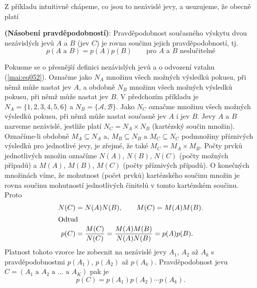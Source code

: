       
      
      Z příkladu intuitivně chápeme, co jsou to nezávislé jevy, a usuzujeme, že obecně platí
      \begin{lemma}\label{mai:lemma003}
        \textbf{(Násobení pravděpodobností)}: Pravděpodobnost současného výskytu dvou nezávislých 
        jevů \(A\) a \(B\) (jev \(C\)) je rovna součinu jejich pravděpodobností, tj.
        \begin{equation}\label{mai:eq052}
           p(A \text{ a } B)= p(A)p(B)\qquad \text{pro } A \text{ a } B \text{ neslučitelné}
        \end{equation}
      \end{lemma}
      
      Pokusme se o přesnější definici nezávislých jevů a o odvození vztahu (\ref{mai:eq052}). 
      Označme jako \(N_A\) množinu všech možných výsledků pokusu, při němž může nastat jev \(A\), a 
      obdobně \(N_B\) množinu všech možných výsledků pokusu, při němž může nastat jev \(B\). V 
      předchozím příkladu je \(N_A = \{1, 2, 3, 4, 5, 6\}\) a \(N_B = \{\mathcal{A}, 
      \mathcal{B}\}\). Jako \(N_C\) označme množinu všech možných výsledků pokusu, při němž může 
      nastat současně jev \(A\) i jev \(B\). Jevy \(A\) a \(B\) nazveme nezávislé, jestliže
      platí \(N_C = N_A \times N_B\) (kartézský součin množin). Označíme-li obdobně \(M_A \subseteq 
      N_A\) a, \(M_B \subseteq N_B\) a \(M_C \subseteq N_C\) podmnožiny příznivých výsledků pro 
      jednotlivé jevy, je zřejmé, že také \(M_C = M_A \times M_B\). Počty prvků jednotlivých množin 
      označíme \(N(A)\), \(N(B)\), \(N(C)\) (počty možných případů) a \(M(A)\), \(M(B)\), \(M(C)\) 
      (počty příznivých případů). O konečných množinách víme, že mohutnost (počet prvků) 
      kartézského součinu množin je rovna součinu mohutností jednotlivých
      činitelů v tomto kartézském součinu. Proto
      \begin{align*}
        N(C) &= N(A)N(B),\qquad M(C) = M(A)M(B). \\
        \shortintertext{Odtud}
        p(C) &= \dfrac{M(C)}{N(C)} = \dfrac{M(A)M(B)}{N(A)N(B)} = p(A)p(B).
      \end{align*}
      Platnost tohoto vzorce lze zobecnit na nezávislé jevy \(A_1\), \(A_2\) až \(A_k\) s 
      pravděpodobnostmi \(p(A_1)\), \(p(A_2)\) až \(p(A_k)\). Pravděpodobnost jevu \(C = (A_1\text{ 
      a }A_2\text{ a }...\text{ a }A_K)\) pak je
      \begin{equation*}
        p(C) = p(A_1)p(A_2)\cdots p(A_k).
      \end{equation*}
 
